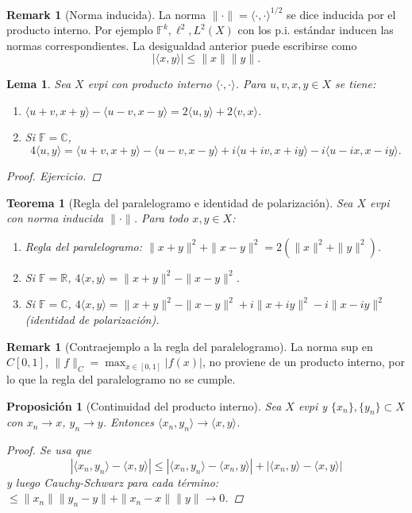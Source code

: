 \documentclass[11pt]{article}
\theoremstyle{definition}
\newtheorem{remark}[definition]{Remark}
\theoremstyle{plain}
\newtheorem{lemma}[definition]{Lema}
\newtheorem{proposition}[definition]{Proposición}
\newtheorem{theorem}[definition]{Teorema}
\begin{document}
\begin{remark}[Norma inducida]
La norma $\|\cdot\|=\langle\cdot,\cdot\rangle^{1/2}$ se dice inducida por el producto interno. Por ejemplo $\mathbb{F}^k,\ell^2,L^2(X)$ con los p.i. estándar inducen las normas correspondientes. La desigualdad anterior puede escribirse como
\[|\langle x,y\rangle|\le\|x\|\|y\|.\]
\end{remark}

\begin{lemma}
Sea $X$ evpi con producto interno $\langle\cdot,\cdot\rangle$. Para $u,v,x,y\in X$ se tiene:
\begin{enumerate}[label=\alph*)]
\item $\langle u+v,x+y\rangle-\langle u-v,x-y\rangle=2\langle u,y\rangle+2\langle v,x\rangle$.
\item Si $\mathbb{F}=\mathbb{C}$, 
\[4\langle u,y\rangle=\langle u+v,x+y\rangle-\langle u-v,x-y\rangle+i\langle u+iv,x+iy\rangle-i\langle u-ix,x-iy\rangle.
\]
\end{enumerate}
\begin{proof}
Ejercicio.
\end{proof}
\end{lemma}

\begin{theorem}[Regla del paralelogramo e identidad de polarización]
Sea $X$ evpi con norma inducida $\|\cdot\|$. Para todo $x,y\in X$:
\begin{enumerate}[label=\alph*)]
\item Regla del paralelogramo: $\|x+y\|^2+\|x-y\|^2=2(\|x\|^2+\|y\|^2)$.
\item Si $\mathbb{F}=\mathbb{R}$, $4\langle x,y\rangle=\|x+y\|^2-\|x-y\|^2$.
\item Si $\mathbb{F}=\mathbb{C}$, $4\langle x,y\rangle=\|x+y\|^2-\|x-y\|^2+i\|x+iy\|^2-i\|x-iy\|^2$ (identidad de polarización).
\end{enumerate}
\end{theorem}

\begin{remark}[Contraejemplo a la regla del paralelogramo]
La norma sup en $C[0,1]$, $\|f\|_{C}=\max_{x\in[0,1]}|f(x)|$, no proviene de un producto interno, por lo que la regla del paralelogramo no se cumple.
\end{remark}

\begin{proposition}[Continuidad del producto interno]
Sea $X$ evpi y $\{x_n\},\{y_n\}\subset X$ con $x_n\to x$, $y_n\to y$. Entonces $\langle x_n,y_n\rangle\to\langle x,y\rangle$.
\begin{proof}
Se usa que
\[|\langle x_n,y_n\rangle-\langle x,y\rangle|\le|\langle x_n,y_n\rangle-\langle x_n,y\rangle|+|\langle x_n,y\rangle-\langle x,y\rangle|\]
y luego Cauchy-Schwarz para cada término: $\le\|x_n\|\|y_n-y\|+\|x_n-x\|\|y\|\to0$.
\end{proof}
\end{proposition}
\end{document}
